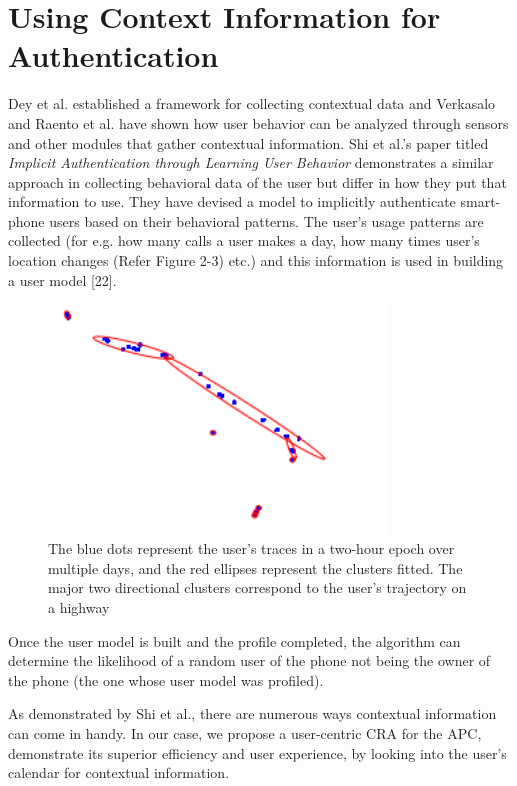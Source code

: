 \documentclass[12pt]{uthesis-v12}  %
\begin{document}
	\section{Using Context Information for Authentication}
		Dey et al. established a framework for collecting contextual data and Verkasalo and Raento et al. have shown how user behavior can be analyzed through sensors and other modules that gather contextual information. Shi et al.'s paper titled {\em Implicit Authentication through Learning User Behavior} demonstrates a similar approach in collecting behavioral data of the user but differ in how they put that information to use. They have devised a model to implicitly authenticate smart-phone users based on their behavioral patterns. The user's usage patterns are collected (for e.g. how many calls a user makes a day, how many times user's location changes (Refer Figure 2-3) etc.) and this information is used in building a user model [22].  
		
		\begin{figure}[!ht]
			\centering
			\includegraphics[width = 90mm]{images/gpsTrace.png}
			\caption[User's GPS Trace]
			{The blue dots represent the user’s traces in a two-hour epoch over multiple days, and the red ellipses represent the clusters fitted. The major two directional clusters correspond to the user’s trajectory on a highway}
		\end{figure}		
		Once the user model is built and the profile completed, the algorithm can determine the likelihood of a random user of the phone not being the owner of the phone (the one whose user model was profiled). 
		
		As demonstrated by Shi et al., there are numerous ways contextual information can come in handy. In our case, we propose a user-centric CRA for the APC, demonstrate its superior efficiency and user experience, by looking into the user's calendar for contextual information.  			
	
\end{document}
